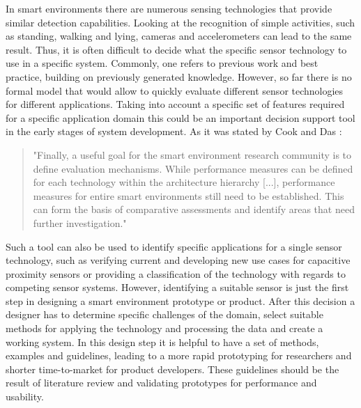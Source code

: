 In smart environments there are numerous sensing technologies that provide similar detection capabilities. Looking at the recognition of simple activities, such as standing, walking and lying, cameras and accelerometers can lead to the same result. Thus, it is often difficult to decide what the specific sensor technology to use in a specific system. Commonly, one refers to previous work and best practice, building on previously generated knowledge. However, so far there is no formal model that would allow to quickly evaluate different sensor technologies for different applications. Taking into account a specific set of features required for a specific application domain this could be an important decision support tool in the early stages of system development. As it was stated by Cook and Das \cite{cook2007smart}:
\begin{quote}
"Finally, a useful goal for the smart environment research community is to define evaluation mechanisms. While performance measures can be defined for each technology within the architecture hierarchy [...], performance measures for entire smart environments still need to be established. This can form the basis of comparative assessments and identify areas that need further investigation."
\end{quote}
Such a tool can also be used to identify specific applications for a single sensor technology, such as verifying current and developing new use cases for capacitive proximity sensors or providing a classification of the technology with regards to competing sensor systems. However, identifying a suitable sensor is just the first step in designing a smart environment prototype or product. After this decision a designer has to determine specific challenges of the domain, select suitable methods for applying the technology and processing the data and create a working system. In this design step it is helpful to have a set of methods, examples and guidelines, leading to a more rapid prototyping for researchers and shorter time-to-market for product developers. These guidelines should be the result of literature review and validating prototypes for performance and usability. 

